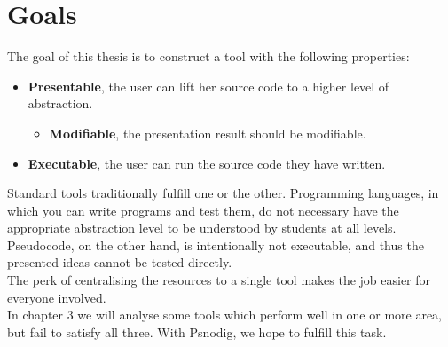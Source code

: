 

\section{Goals}

The goal of this thesis is to construct a tool with the following properties:

\begin{itemize}
    \item \textbf{Presentable}, the user can lift her source code to a higher level of abstraction.
    \begin{itemize}
        \item \textbf{Modifiable}, the presentation result should be modifiable.
    \end{itemize}
    \item \textbf{Executable}, the user can run the source code they have written.
\end{itemize}


Standard tools traditionally fulfill one or the other. Programming languages, in which you can write programs and test them, do not necessary have the appropriate abstraction level to be understood by students at all levels. Pseudocode, on the other hand, is intentionally not executable, and thus the presented ideas cannot be tested directly. \hfill \\

The perk of centralising the resources to a single tool makes the job easier for everyone involved. \hfill \\

In chapter 3 we will analyse some tools which perform well in one or more area, but fail to satisfy all three. With Psnodig, we hope to fulfill this task.

